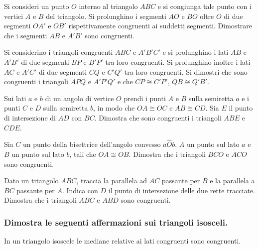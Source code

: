 \begin{multicols}{2}
\begin{esercizio}
\label{ese:2.22}
Si consideri un punto $O$ interno al triangolo $ABC$ e si congiunga tale punto con i vertici $A$ e $B$ del triangolo. Si prolunghino i segmenti $AO$ e $BO$ oltre $O$ di due segmenti $OA'$ e $OB'$ rispettivamente congruenti ai suddetti segmenti. Dimostrare che i segmenti $AB$ e $A'B'$ sono congruenti.
\end{esercizio}

\begin{esercizio}
\label{ese:2.23}
Si considerino i triangoli congruenti $ABC$ e $A'B'C'$ e si prolunghino i lati $AB$ e $A'B'$ di due segmenti $BP$ e $B'P'$ tra loro congruenti. Si prolunghino inoltre i lati $AC$ e $A'C'$ di due segmenti $CQ$ e $C'Q'$ tra loro congruenti. Si dimostri che sono congruenti i triangoli $APQ$ e $A'P'Q'$ e che $CP\cong C'P'$, $QB\cong Q'B'$.
\end{esercizio}

\begin{esercizio}
\label{ese:2.24}
Sui lati $a$ e $b$ di un angolo di vertice $O$ prendi i punti $A$ e $B$ sulla semiretta $a$ e i punti $C$ e $D$ sulla semiretta $b$, in modo che $OA\cong OC$ e $AB\cong CD$. Sia $E$ il punto di intersezione di $AD$ con $BC$. Dimostra che sono congruenti i triangoli $ABE$ e $CDE$.
\end{esercizio}

\begin{esercizio}
\label{ese:2.25}
Sia $C$ un punto della bisettrice dell'angolo convesso $a\widehat{O}b$, $A$ un punto sul lato $a$ e $B$ un punto sul lato $b$, tali che $OA\cong OB$. Dimostra che i triangoli $BCO$ e $ACO$ sono congruenti.
\end{esercizio}

\begin{esercizio}
\label{ese:2.26}
Dato un triangolo $ABC$, traccia la parallela ad $AC$ passante per $B$ e la parallela a $BC$ passante per $A$. Indica con $D$ il punto di intersezione delle due rette tracciate. Dimostra che i triangoli $ABC$ e $ABD$ sono congruenti.
\end{esercizio}

\subsubsection*{Dimostra le seguenti affermazioni sui triangoli isosceli.}

\begin{esercizio}
\label{ese:2.27}
In un triangolo isoscele le mediane relative ai lati congruenti sono congruenti. 
\end{esercizio}


\end{multicols}
